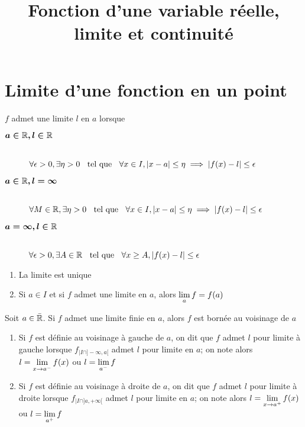 

\title{Fonction d'une variable réelle, limite et continuité}



\maketitle
\pagebreak

\section{Limite d'une fonction en un point}
\begin{dfn} 
$f$ admet une limite $l$ en $a$ lorsque
\begin{description}
    \item[$\boldsymbol{a \in \mathbb{R}, l \in \mathbb{R}}$] \hfill \\
    $\forall \epsilon > 0, \exists \eta > 0 \;\;\text{ tel que }\;\; \forall x \in I, |x - a|
    \leq \eta \implies |f(x) - l| \leq \epsilon$
    \item[$\boldsymbol{a \in \mathbb{R}, l = \infty}$] \hfill \\
    $\forall M \in \mathbb{R}, \exists \eta > 0 \;\;\text{ tel que }\;\; \forall x \in I,
    |x - a| \leq \eta \implies |f(x) - l| \leq \epsilon$
    \item[$\boldsymbol{a = \infty, l \in \mathbb{R}}$] \hfill \\
    $\forall \epsilon > 0, \exists A \in \mathbb{R} \;\;\text{ tel que }\;\; \forall x \geq A,
    |f(x) - l| \leq \epsilon$
\end{description}
\end{dfn}

\begin{prp} 
\begin{enumerate}
    \item La limite est unique
    \item Si $a \in I$ et si $f$ admet une limite en $a$, alors
    $\lim\limits_{a} f = f(a)$
\end{enumerate}
\end{prp}

\begin{prp} 
Soit $a \in \bar{\mathbb{R}}$. Si $f$ admet une limite finie en $a$, alors
$f$ est bornée au voisinage de $a$
\end{prp}

\begin{dfn} 
\begin{enumerate}
    \item Si $f$ est définie au voisinage à gauche de $a$, on dit que
    $f$ admet $l$ pour limite à gauche lorsque $f_{|I\cap ]-\infty, a[}$
    admet $l$ pour limite en $a$; on note alors
    $l = \lim\limits_{x \to a^-} f(x)$ ou $l = \lim\limits_{a^-} f$
    \item Si $f$ est définie au voisinage à droite de $a$, on dit que
    $f$ admet $l$ pour limite à droite lorsque $f_{|I\cap ]a, +\infty[}$
    admet $l$ pour limite en $a$; on note alors
    $l = \lim\limits_{x \to a^+} f(x)$ ou $l = \lim\limits_{a^+} f$
\end{enumerate}
\end{dfn}

